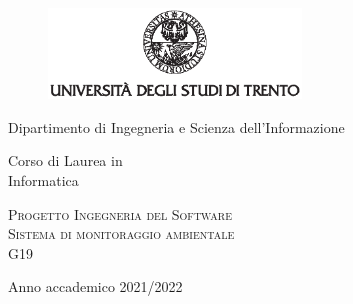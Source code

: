\pagestyle{plain}
\thispagestyle{empty}

\graphicspath{{assets/figures/}}

\begin{center}
	\begin{figure}[h!]
		\centerline{\includegraphics[width=0.6\textwidth]{Img/logo_unitn_black_center.eps}}
	\end{figure}

	\vspace{2 cm}

	\LARGE{Dipartimento di Ingegneria e Scienza dell’Informazione}

	\vspace{1 cm}

	\Large{
		Corso di Laurea in\\
		Informatica
	}

	\vspace{2 cm}
	\Large\textsc{Progetto Ingegneria del Software\\}
	\vspace{1 cm}
	\Huge\textsc{Sistema di monitoraggio ambientale\\}
	\vspace{1cm}
	\Large{G19}

	\vspace{4cm}

	\Large{Anno accademico 2021/2022}
\end{center}